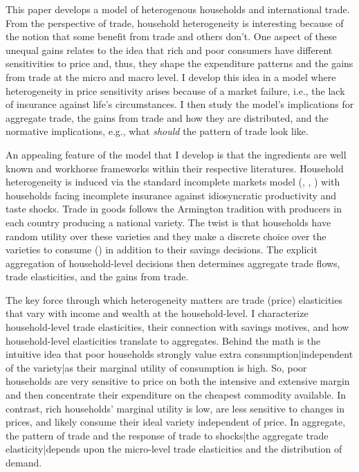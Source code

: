 \documentclass[12pt,pdftex]{article}
\begin{document}
\begin{onehalfspacing}
\hspace{-0.05cm}



\thispagestyle{empty}
\newpage
\normalsize

This paper develops a model of heterogenous households and international trade. From the perspective of trade, household heterogeneity is interesting because of the notion that some benefit from trade and others don't. One aspect of these unequal gains relates to the idea that rich and poor consumers have different sensitivities to price and, thus, they shape the expenditure patterns and the gains from trade at the micro and macro level. I develop this idea in a model where heterogeneity in price sensitivity arises because of a market failure, i.e., the lack of insurance against life's circumstances. I then study the model's implications for aggregate trade, the gains from trade and how they are distributed, and the normative implications, e.g., what \emph{should} the pattern of trade look like.


An appealing feature of the model that I develop is that the ingredients are well known and workhorse frameworks within their respective literatures. Household heterogeneity is induced via the standard incomplete markets model (\citet{bewley1979optimum}, \citet{huggett1993risk}, \citet{aiyagari1994uninsured}) with households facing incomplete insurance against idiosyncratic productivity and taste shocks. Trade in goods follows the Armington tradition with producers in each country producing a national variety. The twist is that households have random utility over these varieties and they make a discrete choice over the varieties to consume (\citet{mcfadden1974frontiers}) in addition to their savings decisions. The explicit aggregation of household-level decisions then determines aggregate trade flows, trade elasticities, and the gains from trade.

The key force through which heterogeneity matters are trade (price) elasticities that vary with income and wealth at the household-level. I characterize household-level trade elasticities, their connection with savings motives, and how household-level elasticities translate to aggregates. Behind the math is the intuitive idea that poor households strongly value extra consumption|independent of the variety|as their marginal utility of consumption is high. So, poor households are very sensitive to price on both the intensive and extensive margin and then concentrate their expenditure on the cheapest commodity available. In contrast, rich households' marginal utility is low, are less sensitive to changes in prices, and likely consume their ideal variety independent of price. In aggregate, the pattern of trade and the response of trade to shocks|the aggregate trade elasticity|depends upon the micro-level trade elasticities and the distribution of demand.


\end{onehalfspacing}
\end{document}
